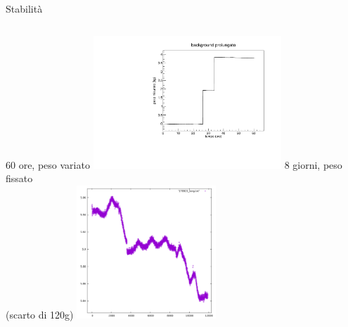 \documentclass{beamer}
\begin{document}
\begin{frame}{Stabilit\`a}
  \begin{columns}[c]
      \large{60 ore, peso variato}
      \includegraphics[height=5cm]{../../analisi_dati/background/60h}
      \large{8 giorni, peso fissato}
      \\\small{(scarto di 120g)}
      \includegraphics[height=5cm]{../../analisi_dati/background/8gg}
  \end{columns}
\end{frame}
\end{document}
